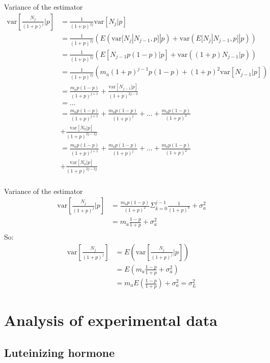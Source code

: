 \documentclass{beamer}
\begin{document}
\begin{frame}{Variance of the estimator}
\begin{align*}
\text{var}[\frac{N_j}{(1+p)^j}|p] &= \frac{1}{(1+p)^{2j}}\text{var}[N_j|p] \\
&= \frac{1}{(1+p)^{2j}} ( E(\text{var}[N_j|N_{j-1},p]|p) + \text{var}(E[N_j|N_{j-1},p]|p) ) \\
&= \frac{1}{(1+p)^{2j}} ( E[N_{j-1}p(1-p)|p] + \text{var}((1+p)N_{j-1}|p) ) \\
&= \frac{1}{(1+p)^{2j}} ( m_a (1+p)^{j-1}p(1-p) + (1+p)^2\text{var}[N_{j-1}|p] ) \\
&= \frac{m_a p (1-p)}{(1+p)^{j+1}}  + \frac{\text{var}[N_{j-1}|p]}{(1+p)^{2j-2}} \\
&= \dots \\
&= \frac{m_a p (1-p)}{(1+p)^{j+1}}  + \frac{m_a p (1-p)}{(1+p)^{j}} + \dots + \frac{m_a p (1-p)}{(1+p)^{2}} \\ &+ \frac{\text{var}[N_{0}|p]}{(1+p)^{2j-2j}} \\
&= \frac{m_a p (1-p)}{(1+p)^{j+1}}  + \frac{m_a p (1-p)}{(1+p)^{j}} + \dots + \frac{m_a p (1-p)}{(1+p)^{2}} \\ 
& + \frac{\text{var}[N_{0}|p]}{(1+p)^{2j-2j}} \\
\end{align*}
\end{frame}


\begin{frame}{Variance of the estimator}
\begin{align*}
\text{var}[\frac{N_j}{(1+p)^j}|p] &= \frac{m_a p (1-p)}{(1+p)^{2}} \Sigma_{k=0}^{j-1}\frac{1}{(1+p)^k} + \sigma^2_a \\ 
&= m_a  \frac{1-p}{1+p} + \sigma^2_a \\
\end{align*}
So:
\begin{align*}
\text{var}[\frac{N_j}{(1+p)^j}] &= E(\text{var}[\frac{N_j}{(1+p)^j}|p])\\
&= E(m_a \frac{1-p}{1+p} + \sigma^2_a) \\
&= m_a E(\frac{1-p}{1+p}) + \sigma^2_a = \sigma^2_L
\end{align*}
\end{frame}


\section{Analysis of experimental data}
\subsection{Luteinizing hormone}
\end{document}
